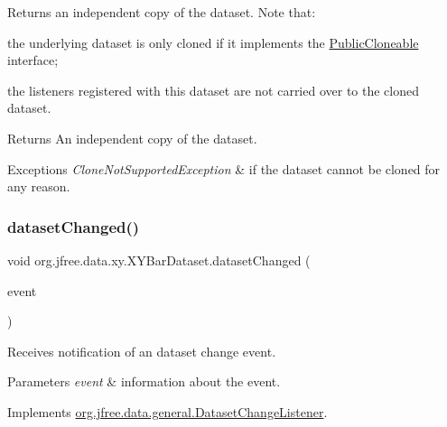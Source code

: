 Returns an independent copy of the dataset. Note that\+: 
\begin{DoxyItemize}
\item the underlying dataset is only cloned if it implements the \mbox{\hyperlink{}{Public\+Cloneable}} interface; 
\item the listeners registered with this dataset are not carried over to the cloned dataset. 
\end{DoxyItemize}

\begin{DoxyReturn}{Returns}
An independent copy of the dataset.
\end{DoxyReturn}

\begin{DoxyExceptions}{Exceptions}
{\em Clone\+Not\+Supported\+Exception} & if the dataset cannot be cloned for any reason. \\
\hline
\end{DoxyExceptions}
\mbox{\label{classorg_1_1jfree_1_1data_1_1xy_1_1_x_y_bar_dataset_afb40c3c8580e0a88758707acb30d5d17}} 
\subsubsection{\texorpdfstring{dataset\+Changed()}{datasetChanged()}}
{\footnotesize\ttfamily void org.\+jfree.\+data.\+xy.\+X\+Y\+Bar\+Dataset.\+dataset\+Changed (\begin{DoxyParamCaption}\item[{\mbox{\hyperlink{classorg_1_1jfree_1_1data_1_1general_1_1_dataset_change_event}{Dataset\+Change\+Event}}}]{event }\end{DoxyParamCaption})}

Receives notification of an dataset change event.


\begin{DoxyParams}{Parameters}
{\em event} & information about the event. \\
\hline
\end{DoxyParams}


Implements \mbox{\hyperlink{interfaceorg_1_1jfree_1_1data_1_1general_1_1_dataset_change_listener_a26ca53969f0dfa539f52e846a3cd72fe}{org.\+jfree.\+data.\+general.\+Dataset\+Change\+Listener}}.


